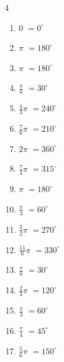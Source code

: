 \begin{multicols}{4}
\begin{enumerate}
  \item $\displaystyle 0$
        $\displaystyle =0^{\circ}$

  \item $\displaystyle \pi$
        $\displaystyle =180^{\circ}$

  \item $\displaystyle \pi$
        $\displaystyle =180^{\circ}$

  \item $\displaystyle \frac{\pi}{6}$
        $\displaystyle =30^{\circ}$

  \item $\displaystyle \frac{4}{3}\pi$
        $\displaystyle =240^{\circ}$

  \item $\displaystyle \frac{7}{6}\pi$
        $\displaystyle =210^{\circ}$

  \item $\displaystyle 2\pi$
        $\displaystyle =360^{\circ}$

  \item $\displaystyle \frac{7}{4}\pi$
        $\displaystyle =315^{\circ}$

  \item $\displaystyle \pi$
        $\displaystyle =180^{\circ}$

  \item $\displaystyle \frac{\pi}{3}$
        $\displaystyle =60^{\circ}$

  \item $\displaystyle \frac{3}{2}\pi$
        $\displaystyle =270^{\circ}$

  \item $\displaystyle \frac{11}{6}\pi$
        $\displaystyle =330^{\circ}$

  \item $\displaystyle \frac{\pi}{6}$
        $\displaystyle =30^{\circ}$

  \item $\displaystyle \frac{2}{3}\pi$
        $\displaystyle =120^{\circ}$

  \item $\displaystyle \frac{\pi}{3}$
        $\displaystyle =60^{\circ}$

  \item $\displaystyle \frac{\pi}{4}$
        $\displaystyle =45^{\circ}$

  \item $\displaystyle \frac{5}{6}\pi$
        $\displaystyle =150^{\circ}$


\end{enumerate}
\end{multicols}
